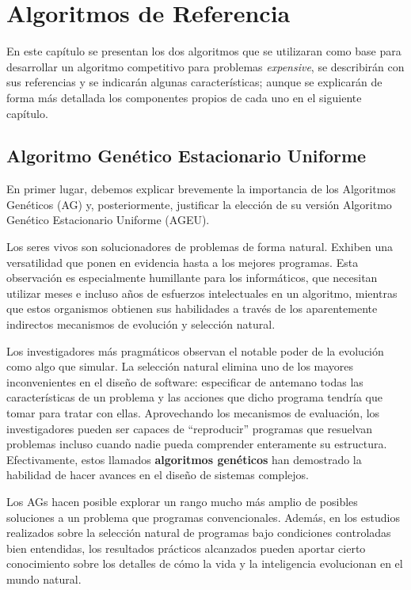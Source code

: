 \chapter{Algoritmos de Referencia}

En este capítulo se presentan los dos algoritmos que se utilizaran como base para desarrollar un algoritmo competitivo para problemas \textit{expensive}, se describirán con sus referencias y se indicarán algunas características; aunque se explicarán de forma más detallada los componentes propios de cada uno en el siguiente capítulo.

\section{Algoritmo Genético Estacionario Uniforme}

En primer lugar, debemos explicar brevemente la importancia de los Algoritmos Genéticos (AG) y, posteriormente, justificar la elección de su versión Algoritmo Genético Estacionario Uniforme (AGEU). 

Los seres vivos son solucionadores de problemas de forma natural. 
Exhiben una versatilidad que ponen en evidencia hasta a los mejores programas. 
Esta observación es especialmente humillante para los informáticos, que necesitan utilizar meses e incluso años de esfuerzos intelectuales en un algoritmo, mientras que estos organismos obtienen sus habilidades a través de los aparentemente indirectos mecanismos de evolución y selección natural. 

Los investigadores más pragmáticos observan el notable poder de la evolución como algo que simular. 
La selección natural elimina uno de los mayores inconvenientes en el diseño de software: especificar de antemano todas las características de un problema y las acciones que dicho programa tendría que tomar para tratar con ellas. 
Aprovechando los mecanismos de evaluación, los investigadores pueden ser capaces de ``reproducir'' programas que resuelvan problemas incluso cuando nadie pueda comprender enteramente su estructura. 
Efectivamente, estos llamados \textbf{algoritmos genéticos} han demostrado la habilidad de hacer avances en el diseño de sistemas complejos. 

Los AGs hacen posible explorar un rango mucho más amplio de posibles soluciones a un problema que programas convencionales. 
Además, en los estudios  realizados sobre la selección natural de programas bajo condiciones controladas bien entendidas, los resultados prácticos alcanzados pueden aportar cierto conocimiento sobre los detalles de cómo la vida y la inteligencia evolucionan en el mundo natural. 

